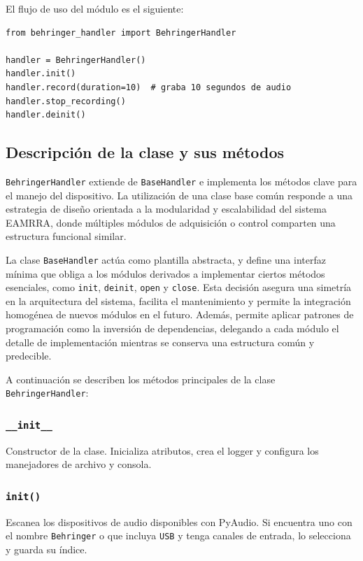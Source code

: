 El flujo de uso del módulo es el siguiente:

\begin{verbatim}
from behringer_handler import BehringerHandler

handler = BehringerHandler()
handler.init()
handler.record(duration=10)  # graba 10 segundos de audio
handler.stop_recording()
handler.deinit()
\end{verbatim}

\subsection{Descripción de la clase y sus métodos}

\texttt{BehringerHandler} extiende de \texttt{BaseHandler} e implementa los métodos clave para el manejo del dispositivo. La utilización de una clase base común responde a una estrategia de diseño orientada a la modularidad y escalabilidad del sistema EAMRRA, donde múltiples módulos de adquisición o control comparten una estructura funcional similar. 

La clase \texttt{BaseHandler} actúa como plantilla abstracta, y define una interfaz mínima que obliga a los módulos derivados a implementar ciertos métodos esenciales, como \texttt{init}, \texttt{deinit}, \texttt{open} y \texttt{close}. Esta decisión asegura una simetría en la arquitectura del sistema, facilita el mantenimiento y permite la integración homogénea de nuevos módulos en el futuro. Además, permite aplicar patrones de programación como la inversión de dependencias, delegando a cada módulo el detalle de implementación mientras se conserva una estructura común y predecible.

A continuación se describen los métodos principales de la clase \texttt{BehringerHandler}:

\subsubsection*{\texttt{\_\_init\_\_}}

Constructor de la clase. Inicializa atributos, crea el logger y configura los manejadores de archivo y consola.

\subsubsection*{\texttt{init()}}

Escanea los dispositivos de audio disponibles con PyAudio. Si encuentra uno con el nombre \texttt{Behringer} o que incluya \texttt{USB} y tenga canales de entrada, lo selecciona y guarda su índice.

